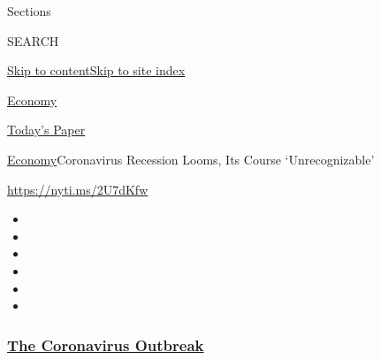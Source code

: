Sections

SEARCH

\protect\hyperlink{site-content}{Skip to
content}\protect\hyperlink{site-index}{Skip to site index}

\href{https://www.nytimes3xbfgragh.onion/section/business/economy}{Economy}

\href{https://myaccount.nytimes3xbfgragh.onion/auth/login?response_type=cookie\&client_id=vi}{}

\href{https://www.nytimes3xbfgragh.onion/section/todayspaper}{Today's
Paper}

\href{/section/business/economy}{Economy}\textbar{}Coronavirus Recession
Looms, Its Course `Unrecognizable'

\url{https://nyti.ms/2U7dKfw}

\begin{itemize}
\item
\item
\item
\item
\item
\item
\end{itemize}

\hypertarget{the-coronavirus-outbreak}{%
\subsubsection{\texorpdfstring{\href{https://www.nytimes3xbfgragh.onion/news-event/coronavirus?name=styln-coronavirus-markets\&region=TOP_BANNER\&block=storyline_menu_recirc\&action=click\&pgtype=Article\&impression_id=3e72a070-f4bc-11ea-b75e-3f4305a6ad65\&variant=undefined}{The
Coronavirus
Outbreak}}{The Coronavirus Outbreak}}\label{the-coronavirus-outbreak}}

